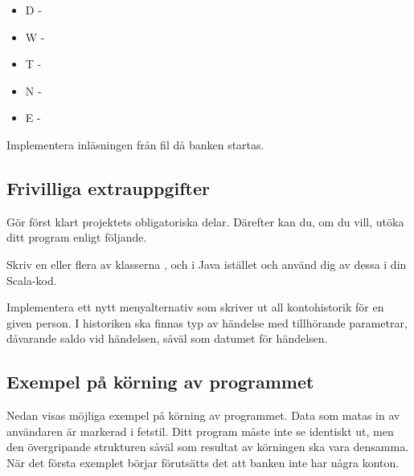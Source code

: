 \begin{itemize}
\item D - 
\item W - 
\item T - 
\item N - 
\item E - 
\end{itemize}

\Subtask Implementera inläsningen från fil då banken startas.


\subsection{Frivilliga extrauppgifter}

Gör först klart projektets obligatoriska delar. Därefter kan du, om du vill, utöka ditt
program enligt följande.

\Task Skriv en eller flera av klasserna ,  och  i Java istället och använd dig av dessa i din Scala-kod.

\Task	Implementera ett nytt menyalternativ som skriver ut all kontohistorik för en given person. I historiken ska finnas typ av händelse med tillhörande parametrar, dåvarande saldo vid händelsen, såväl som datumet för händelsen.

\subsection{Exempel på körning av programmet}

Nedan visas möjliga exempel på körning av programmet. Data som matas in av användaren är markerad i fetstil.
Ditt program måste inte se identiskt ut, men den övergripande strukturen såväl som resultat av körningen ska vara densamma.
När det första exemplet börjar förutsätts det att banken inte har några konton.

